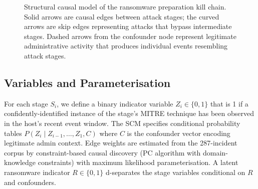 \documentclass[sigconf,nonacm]{acmart}
\begin{document}
\begin{figure}[h]
\centering
{}%
\caption{Structural causal model of the ransomware preparation kill
  chain. Solid arrows are causal edges between attack stages; the
  curved arrows are skip edges representing attacks that bypass
  intermediate stages. Dashed arrows from the confounder node represent
  legitimate administrative activity that produces individual events
  resembling attack stages.}
\label{fig:scm}
\end{figure}

\subsection{Variables and Parameterisation}

For each stage $S_i$, we define a binary indicator variable
$Z_i \in \{0, 1\}$ that is 1 if a confidently-identified instance of
the stage's MITRE technique has been observed in the host's recent
event window. The SCM specifies conditional probability tables
$P(Z_i \mid Z_{i-1}, \ldots, Z_1, C)$ where $C$ is the confounder
vector encoding legitimate admin context. Edge weights are estimated
from the 287-incident corpus by constraint-based causal discovery
(PC algorithm with domain-knowledge constraints) with maximum
likelihood parameterisation. A latent ransomware indicator
$R \in \{0,1\}$ d-separates the stage variables conditional on $R$
and confounders.
\end{document}
